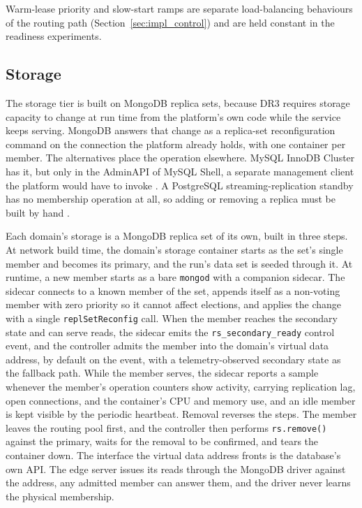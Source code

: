 ﻿\documentclass[12pt,reqno,twoside]{amsbook}
\begin{document}
Warm-lease priority and slow-start ramps are separate load-balancing
behaviours of the routing path (Section~\ref{sec:impl_control}) and
are held constant in the readiness experiments.

\subsection{Storage}\label{sec:impl_data}

The storage tier is built on MongoDB replica sets, because DR3 requires storage
capacity to change at run time from the platform's own code while the service
keeps serving. MongoDB answers that change as a replica-set reconfiguration
command on the connection the platform already holds, with one container per
member. The alternatives place the operation elsewhere. MySQL InnoDB Cluster has
it, but only in the AdminAPI of MySQL Shell, a separate management client the
platform would have to invoke
\parencite{MySQLDocsAdminAPI,MySQLDocsInnoDBCluster}. A PostgreSQL
streaming-replication standby has no membership operation at all, so adding or
removing a replica must be built by hand
\parencite{PostgreSQLDocsWarmStandby}.

Each domain's storage is a MongoDB replica set of its own, built in three
steps. At network build time, the domain's storage container starts as
the set's single member and becomes its primary, and the run's data set
is seeded through it. At runtime, a new member starts as a bare
\texttt{mongod} with a companion sidecar. The sidecar connects to a known
member of the set, appends itself as a non-voting member with zero
priority so it cannot affect elections, and applies the change with a
single \texttt{replSetReconfig} call. When the member reaches the
secondary state and can serve reads, the sidecar emits the
\texttt{rs\_secondary\_ready} control event, and the controller admits
the member into the domain's virtual data address, by default on the
event, with a telemetry-observed secondary state as the fallback path.
While the member serves, the sidecar reports a sample whenever the member's
operation counters show activity, carrying replication lag, open connections,
and the container's CPU and memory use, and an idle member is kept visible by
the periodic heartbeat. Removal reverses the steps. The member leaves the
routing pool first, and the controller then performs \texttt{rs.remove()}
against the primary, waits for the removal to be confirmed, and tears the
container down.
The interface the virtual data address fronts is the database's own API.
The edge server issues its reads through the MongoDB driver against the
address, any admitted member can answer them, and the driver never learns
the physical membership.
\end{document}
